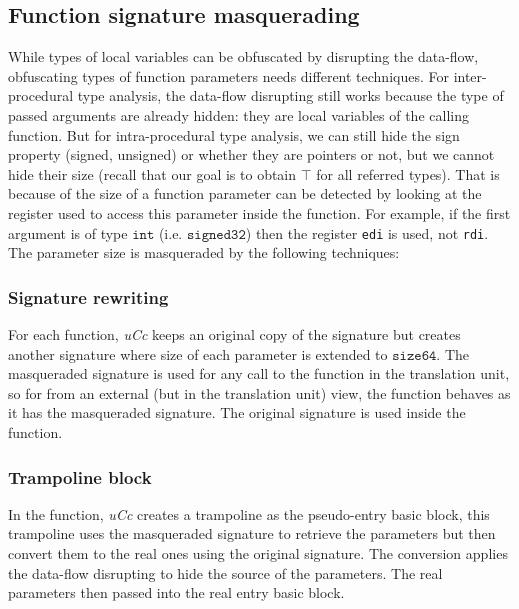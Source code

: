 \documentclass[compsoc,conference,a4paper,10pt,times]{IEEEtran}
\begin{document}
\subsection{Function signature masquerading}
\noindent
While types of local variables can be obfuscated by disrupting the data-flow, obfuscating
types of function parameters needs different techniques. For inter-procedural type analysis,
the data-flow disrupting still works because the type of passed arguments are already hidden: they
are local variables of the calling function. But for intra-procedural type analysis, we can still hide
the sign property (signed, unsigned) or whether they are pointers or not, but we cannot hide their
size (recall that our goal is to obtain $\top$ for all referred types).
That is because of the size of a function parameter can be detected
by looking at the register used to access this parameter inside the function. For example, if the first argument is of type
$\mathtt{int}$ (i.e. $\mathtt{signed32}$) then the register \texttt{edi} is used, not \texttt{rdi}.
The parameter size is masqueraded by the following techniques:

\subsubsection*{Signature rewriting}
For each function, \emph{uCc} keeps an original copy of the signature but creates another signature
where size of each parameter is extended to $\mathtt{size64}$. The masqueraded signature is used
for any call to the function in the translation unit, so for from an external
(but in the translation unit) view, the function behaves as it has the masqueraded signature. The
original signature is used inside the function.

\subsubsection*{Trampoline block}
In the function, \emph{uCc} creates a trampoline as the pseudo-entry basic block, this trampoline uses
the masqueraded signature to retrieve the parameters but then convert them to the real ones using
the original signature. The conversion applies the data-flow disrupting to hide the source of
the parameters. The real parameters then passed into the real entry basic block.
\end{document}

